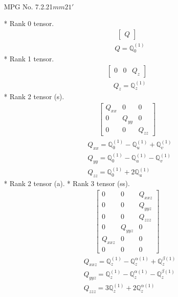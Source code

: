 \documentclass[fleqn,8pt,landscape]{jsarticle}
\begin{document}
\setcounter{MaxMatrixCols}{32}

\renewcommand{\tablename}{Table~}
\renewcommand{\figurename}{Figure~}
\begin{center}
\LARGE
MPG No. 7.2.21\quad$mm21'$
\end{center}
* Rank 0 tensor.
\begin{align*}
\begin{bmatrix} Q \end{bmatrix}
\end{align*}
\begin{align*}
& Q = \mathbb{Q}_{0}^{(1)}
\end{align*}
* Rank 1 tensor.
\begin{align*}
\begin{bmatrix} 0 & 0 & Q_{z} \end{bmatrix}
\end{align*}
\begin{align*}
& Q_{z} = \mathbb{Q}_{z}^{(1)}
\end{align*}
* Rank 2 tensor (s).
\begin{align*}
\begin{bmatrix} Q_{xx} & 0 & 0 \\ 0 & Q_{yy} & 0 \\ 0 & 0 & Q_{zz} \end{bmatrix}
\end{align*}
\begin{align*}
& Q_{xx} = \mathbb{Q}_{0}^{(1)} - \mathbb{Q}_{u}^{(1)} + \mathbb{Q}_{v}^{(1)} \\
& Q_{yy} = \mathbb{Q}_{0}^{(1)} - \mathbb{Q}_{u}^{(1)} - \mathbb{Q}_{v}^{(1)} \\
& Q_{zz} = \mathbb{Q}_{0}^{(1)} + 2 \mathbb{Q}_{u}^{(1)}
\end{align*}
* Rank 2 tensor (a).
* Rank 3 tensor (ss).
\begin{align*}
\begin{bmatrix} 0 & 0 & Q_{xxz} \\ 0 & 0 & Q_{yyz} \\ 0 & 0 & Q_{zzz} \\ 0 & Q_{yyz} & 0 \\ Q_{xxz} & 0 & 0 \\ 0 & 0 & 0 \end{bmatrix}
\end{align*}
\begin{align*}
& Q_{xxz} = \mathbb{Q}_{z}^{(1)} - \mathbb{Q}_{z}^{\alpha(1)} + \mathbb{Q}_{z}^{\beta(1)} \\
& Q_{yyz} = \mathbb{Q}_{z}^{(1)} - \mathbb{Q}_{z}^{\alpha(1)} - \mathbb{Q}_{z}^{\beta(1)} \\
& Q_{zzz} = 3 \mathbb{Q}_{z}^{(1)} + 2 \mathbb{Q}_{z}^{\alpha(1)}
\end{align*}
\end{document}
